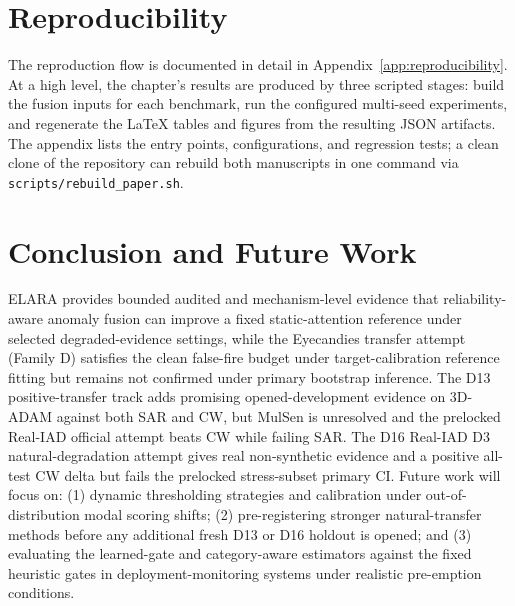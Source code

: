 \documentclass[11pt]{article}
\begin{document}
\section{Reproducibility}

The reproduction flow is documented in detail in
Appendix~\ref{app:reproducibility}. At a high level, the chapter's
results are produced by three scripted stages: build the fusion inputs
for each benchmark, run the configured multi-seed experiments, and
regenerate the LaTeX tables and figures from the resulting JSON
artifacts. The appendix lists the entry points, configurations, and
regression tests; a clean clone of the repository can rebuild both
manuscripts in one command via \texttt{scripts/rebuild\_paper.sh}.

\section{Conclusion and Future Work}
ELARA provides bounded audited and mechanism-level evidence that reliability-aware anomaly fusion can improve a fixed static-attention reference under selected degraded-evidence settings, while the Eyecandies transfer attempt (Family D) satisfies the clean false-fire budget under target-calibration reference fitting but remains not confirmed under primary bootstrap inference.
The D13 positive-transfer track adds promising opened-development evidence on 3D-ADAM against both SAR and CW, but MulSen is unresolved and the prelocked Real-IAD official attempt beats CW while failing SAR. The D16 Real-IAD D3 natural-degradation attempt gives real non-synthetic evidence and a positive all-test CW delta but fails the prelocked stress-subset primary CI. Future work will focus on: (1) dynamic thresholding strategies and calibration under out-of-distribution modal scoring shifts; (2) pre-registering stronger natural-transfer methods before any additional fresh D13 or D16 holdout is opened; and (3) evaluating the learned-gate and category-aware estimators against the fixed heuristic gates in deployment-monitoring systems under realistic pre-emption conditions.
\end{document}
